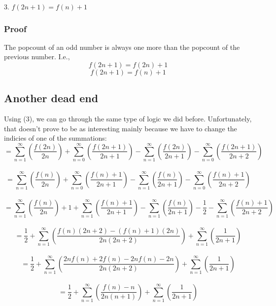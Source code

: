 \documentclass{article}
\begin{document}
3. $f(2n + 1)=f(n) + 1$

\subsubsection{Proof}

The popcount of an odd number is always one more than the popcount of the previous number. I.e.,
$$f(2n + 1)=f(2n)+1$$
$$f(2n + 1)=f(n)+1$$

\subsection{Another dead end}

Using (3), we can go through the same type of logic we did before. Unfortunately, that doesn't prove to be as interesting mainly because we have to change the indicies of one of the summations:
$$=\sum_{n=1}^\infty \left( \frac{f(2n)}{2n} \right)+\sum_{n=0}^\infty \left( \frac{f(2n+1)}{2n+1} \right)
-\sum_{n=1}^\infty \left( \frac{f(2n)}{2n+1} \right)-\sum_{n=0}^\infty \left( \frac{f(2n+1)}{2n+2} \right)$$\\
$$=\sum_{n=1}^\infty \left( \frac{f(n)}{2n} \right)+\sum_{n=0}^\infty \left( \frac{f(n)+1}{2n+1} \right)
-\sum_{n=1}^\infty \left( \frac{f(n)}{2n+1} \right)-\sum_{n=0}^\infty \left( \frac{f(n)+1}{2n+2} \right)$$\\
$$=\sum_{n=1}^\infty \left( \frac{f(n)}{2n} \right)+1+\sum_{n=1}^\infty \left( \frac{f(n)+1}{2n+1} \right)
-\sum_{n=1}^\infty \left( \frac{f(n)}{2n+1} \right)-\frac{1}{2}-\sum_{n=1}^\infty \left( \frac{f(n)+1}{2n+2} \right)$$\\
$$=\frac{1}{2}+\sum_{n=1}^\infty \left( \frac{f(n)(2n+2)-(f(n)+1)(2n)}{2n(2n+2)} \right)+\sum_{n=1}^\infty \left( \frac{1}{2n+1} \right)$$\\
$$=\frac{1}{2}+\sum_{n=1}^\infty \left( \frac{2nf(n)+2f(n)-2nf(n)-2n}{2n(2n+2)} \right)+\sum_{n=1}^\infty \left( \frac{1}{2n+1} \right)$$\\
$$=\frac{1}{2}+\sum_{n=1}^\infty \left( \frac{f(n)-n}{2n(n+1)} \right)+\sum_{n=1}^\infty \left( \frac{1}{2n+1} \right)$$\\
\end{document}
